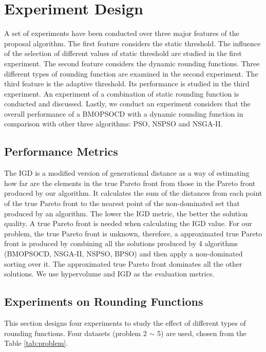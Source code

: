 \section{Experiment Design}
\label{sec:exp}
A set of experiments have been conducted over three major features of the proposal algorithm. 
The first feature considers the static threshold. The influence of the selection of 
different values of static threshold are studied in the first experiment. 
The second feature considers the dynamic rounding functions. Three different types of 
rounding function are examined in the second experiment. The third feature is the adaptive threshold. Its performance is studied in the third experiment. An experiment of a combination of static rounding function is conducted and discussed. Lastly, we conduct an experiment 
considers that the overall performance of a BMOPSOCD with a dynamic rounding function in comparison with other three algorithms: PSO, NSPSO and NSGA-II.



\subsection{Performance Metrics}
The IGD \cite{1501598} is a modified version of generational distance \cite{veldhuizen99, 870296} as a way of estimating 
how far are the elements in the true Pareto front from those in the Pareto front produced by our algorithm. 
It calculates the sum of the distances from each point of the true Pareto front to the nearest point of the non-dominated set that produced by an algorithm.
The lower the IGD metric, the better the solution quality.
A true Pareto front is needed when calculating the IGD value.
For our problem, the true Pareto front is unknown, therefore, a approximated true Pareto front is produced by combining all the solutions produced by
4 algorithms (BMOPSOCD, NSGA-II, NSPSO, BPSO) and then apply a non-dominated sorting over it. The approximated true Pareto front dominates all the other solutions.
We use hypervolume and IGD as the evaluation metrics.

\subsection{Experiments on Rounding Functions}
This section designs four experiments to study the effect of different types of rounding functions. Four datasets (problem 2 $\sim$ 5) are used, chosen from the Table \ref{tab:problem}. 

